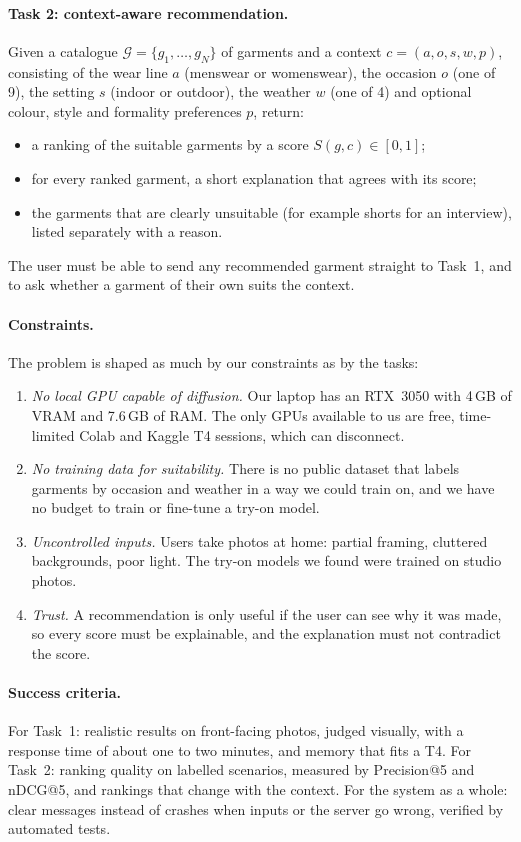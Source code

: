 \documentclass{article}
\begin{document}
\paragraph{Task 2: context-aware recommendation.} Given a catalogue $\mathcal G=\{g_1,\dots,g_N\}$ of
garments and a context $c=(a, o, s, w, p)$, consisting of the wear line $a$ (menswear or womenswear), the
occasion $o$ (one of 9), the setting $s$ (indoor or outdoor), the weather $w$ (one of 4) and optional
colour, style and formality preferences $p$, return:
\begin{itemize}
\item a ranking of the suitable garments by a score $S(g,c)\in[0,1]$;
\item for every ranked garment, a short explanation that agrees with its score;
\item the garments that are clearly unsuitable (for example shorts for an interview), listed
separately with a reason.
\end{itemize}
The user must be able to send any recommended garment straight to Task~1, and to ask whether a garment of
their own suits the context.

\paragraph{Constraints.} The problem is shaped as much by our constraints as by the tasks:
\begin{enumerate}
\item \emph{No local GPU capable of diffusion.} Our laptop has an RTX~3050 with 4\,GB of VRAM and
7.6\,GB of RAM. The only GPUs available to us are free, time-limited Colab and Kaggle T4 sessions, which
can disconnect.
\item \emph{No training data for suitability.} There is no public dataset that labels garments by
occasion and weather in a way we could train on, and we have no budget to train or fine-tune a try-on
model.
\item \emph{Uncontrolled inputs.} Users take photos at home: partial framing, cluttered
backgrounds, poor light. The try-on models we found were trained on studio photos.
\item \emph{Trust.} A recommendation is only useful if the user can see why it was made, so every
score must be explainable, and the explanation must not contradict the score.
\end{enumerate}

\paragraph{Success criteria.} For Task~1: realistic results on front-facing photos, judged visually,
with a response time of about one to two minutes, and memory that fits a T4. For Task~2: ranking
quality on labelled scenarios, measured by Precision@5 and nDCG@5, and rankings that change with the
context. For the system as a whole: clear messages instead of crashes when inputs or the server go
wrong, verified by automated tests.
\end{document}
